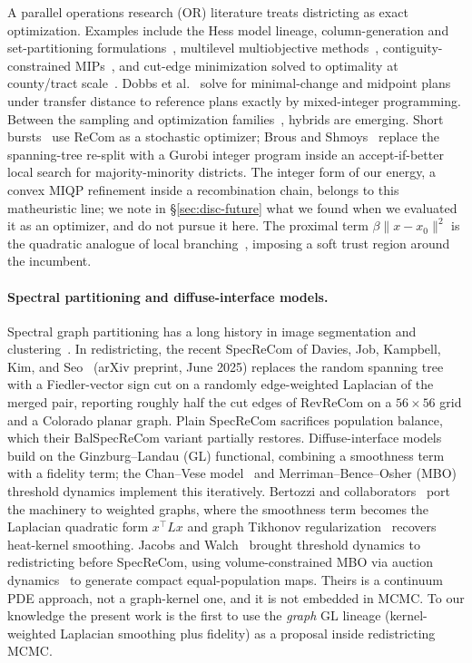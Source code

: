 \documentclass[11pt]{article}
\begin{document}
A parallel operations research (OR) literature treats districting as
exact optimization. Examples include the Hess model lineage,
column-generation and set-partitioning
formulations~\cite{gurnee2021fairmandering}, multilevel
multiobjective methods~\cite{swamy2023multiobjective},
contiguity-constrained MIPs~\cite{validi2022imposing}, and cut-edge
minimization solved to optimality at county/tract
scale~\cite{validi2022political}. Dobbs et al.~\cite{dobbs2024facilitating}
solve for minimal-change and midpoint plans under transfer distance to
reference plans exactly by mixed-integer programming. Between the
sampling and optimization families~\cite{becker2022redistricting},
hybrids are emerging. Short bursts~\cite{cannon2023voting} use ReCom
as a stochastic optimizer; Brous and Shmoys~\cite{brous2025recom}
replace the spanning-tree re-split with a Gurobi integer program
inside an accept-if-better local search for majority-minority
districts. The integer form of our energy, a convex MIQP refinement
inside a recombination chain, belongs to this matheuristic line; we
note in \S\ref{sec:disc-future} what we found when we evaluated it as
an optimizer, and do not pursue it here. The proximal term
$\beta\|x - x_0\|^2$ is the quadratic analogue of local
branching~\cite{fischetti2003local}, imposing a soft trust region
around the incumbent.

\paragraph{Spectral partitioning and diffuse-interface models.}\label{sec:related-spectral}

Spectral graph partitioning has a long history in image segmentation
and clustering~\cite{shi2000normalized}. In redistricting, the recent
SpecReCom of Davies, Job, Kampbell, Kim, and
Seo~\cite{davies2025spectral} (arXiv preprint, June 2025) replaces the
random spanning tree with a Fiedler-vector sign cut on a randomly
edge-weighted Laplacian of the merged pair, reporting roughly half the
cut edges of RevReCom on a $56 \times 56$ grid and a Colorado planar
graph. Plain SpecReCom sacrifices population balance, which their
BalSpecReCom variant partially restores. Diffuse-interface models
build on the Ginzburg--Landau (GL) functional, combining a smoothness
term with a fidelity term; the Chan--Vese model~\cite{chan2001active}
and Merriman--Bence--Osher (MBO) threshold dynamics implement this
iteratively. Bertozzi and collaborators~\cite{bertozzi2012diffuse,
merkurjev2013mbo} port the machinery to weighted graphs, where the
smoothness term becomes the Laplacian quadratic form $x^\top L x$ and
graph Tikhonov regularization~\cite{pilavci2021graph,shuman2013emerging}
recovers heat-kernel smoothing. Jacobs and Walch~\cite{jacobs2018pde}
brought threshold dynamics to redistricting before SpecReCom, using
volume-constrained MBO via auction dynamics~\cite{jacobs2018auction}
to generate compact equal-population maps. Theirs is a continuum PDE
approach, not a graph-kernel one, and it is not embedded in MCMC. To our
knowledge the present work is the first to use the \emph{graph} GL
lineage (kernel-weighted Laplacian smoothing plus fidelity) as a
proposal inside redistricting MCMC.
\end{document}
